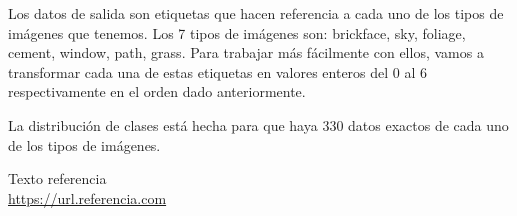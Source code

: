 \documentclass[11pt,a4paper]{article}
\begin{document}
Los datos de salida son etiquetas que hacen referencia a cada uno de los tipos de imágenes que tenemos. Los 7 tipos de imágenes son: brickface, sky, foliage, cement, window, path, grass. Para trabajar más fácilmente con ellos, vamos a transformar cada una de estas etiquetas en valores enteros del 0 al 6 respectivamente en el orden dado anteriormente.

La distribución de clases está hecha para que haya 330 datos exactos de cada uno de los tipos de imágenes.


\newpage

\begin{thebibliography}{5}

Texto referencia
\\\url{https://url.referencia.com}

\end{thebibliography}
\end{document}
